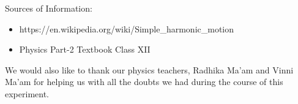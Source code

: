 Sources of Information:
\begin{itemize}
\item https://en.wikipedia.org/wiki/Simple\_harmonic\_motion
  \item Physics Part-2 Textbook Class XII
  \end{itemize}

  We would also like to thank our physics teachers, Radhika Ma'am and Vinni Ma'am for helping us with all the doubts we had during the course of this experiment.
  